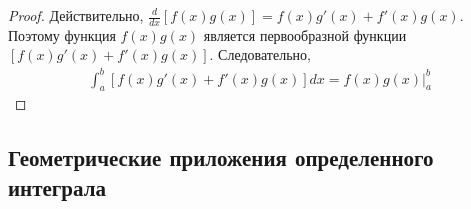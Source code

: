 \documentclass[10pt]{article}
\begin{document}
    \begin{proof}
        Действительно, $\frac{d}{dx}[f(x)g(x)] = f(x)g'(x) + f'(x)g(x)$. Поэтому функция $f(x)g(x)$ является первообразной функции $[f(x)g'(x) + f'(x)g(x)]$. Следовательно,
        \begin{gather*}
            \int_a^b [f(x)g'(x) + f'(x)g(x)]dx = f(x)g(x)|_a^b
        \end{gather*}
    \end{proof}



    \subsection{Геометрические приложения определенного интеграла}
\end{document}

